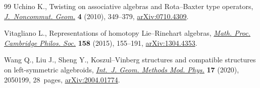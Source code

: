 \documentclass[10pt,a4paper]{amsart}
\numberwithin{equation}{section}
\begin{document}
\begin{thebibliography}{99}
Uchino K., Twisting on associative algebras and {R}ota--{B}axter type
 operators, \href{https://doi.org/10.4171/jncg/59}{\textit{J.~Noncommut. Geom.}} \textbf{4} (2010), 349--379,
 \href{https://arxiv.org/abs/0710.4309}{arXiv:0710.4309}.

Vitagliano L., Representations of homotopy {L}ie--{R}inehart algebras,
 \href{https://doi.org/10.1017/S0305004114000541}{\textit{Math. Proc. Cambridge Philos. Soc.}} \textbf{158} (2015), 155--191,
 \href{https://arxiv.org/abs/1304.4353}{arXiv:1304.4353}.

Wang Q., Liu J., Sheng Y., Koszul--{V}inberg structures and compatible
 structures on left-symmetric algebroids, \href{https://doi.org/10.1142/S0219887820501996}{\textit{Int.~J. Geom. Methods Mod.
 Phys.}} \textbf{17} (2020), 2050199, 28~pages, \href{https://arxiv.org/abs/2004.01774}{arXiv:2004.01774}.

\end{thebibliography}
\end{document}
